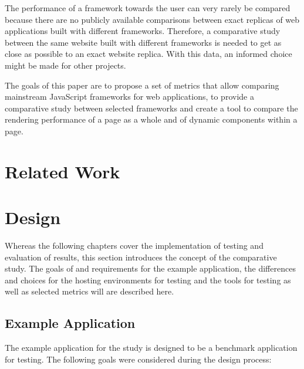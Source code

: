 \documentclass[a4paper, 10pt]{article}
\begin{document}
The performance of a framework towards the user can very rarely be compared because there are no publicly available comparisons between exact replicas of web applications built with different frameworks.
Therefore, a comparative study between the same website built with different frameworks is needed to get as close as possible to an exact website replica.
With this data, an informed choice might be made for other projects.

The goals of this paper are to propose a set of metrics that allow comparing mainstream JavaScript frameworks for web applications, to provide a comparative study between selected frameworks and create a tool to compare the rendering performance of a page as a whole and of dynamic components within a page.

\section{Related Work}\label{sec:relatedwork}
\section{Design}\label{sec:design}

Whereas the following chapters cover the implementation of testing and evaluation of results, this section introduces the concept of the comparative study.
The goals of and requirements for the example application, the differences and choices for the hosting environments for testing and the tools for testing as well as selected metrics will are described here.

\subsection{Example Application}\label{subsec:exampleapplication}
%
% 

The example application for the study is designed to be a benchmark application for testing.
The following goals were considered during the design process:
\end{document}
